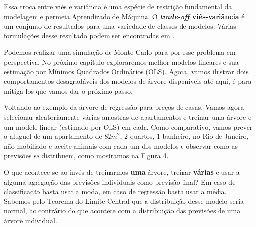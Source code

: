 Essa troca entre viés e variância é uma espécie de restrição fundamental da modelagem e permeia Aprendizado de Máquina. O \textbf{\textit{trade-off} viés-variância} é um conjunto de resultados para uma variedade de classes de modelos. Várias formulações desse resultado podem ser encontradas em .

Podemos realizar uma simulação de Monte Carlo para por esse problema em perspectiva. No próximo capítulo exploraremos melhor modelos lineares e sua estimação por Mínimos Quadrados Ordinários (OLS). Agora, vamos ilustrar dois comportamentos desagradáveis dos modelos de árvore disponíveis até aqui, é para mitiga-los que vamos dar o próximo passo. 

Voltando ao exemplo da árvore de regressão para preços de casas. Vamos agora selecionar aleatoriamente várias amostras de apartamentos e treinar uma árvore e um modelo linear (estimado por OLS) em cada. Como comparativo, vamos prever o aluguel de um apartamento de $82m^2$, $2$ quartos, $1$ banheiro, no Rio de Janeiro, não-mobiliado e aceite animais com cada um dos modelos e observar como as previsões se distribuem, como mostramos na Figura 4.

\begin{figure}[H]
    \centering
        \label{fig:arvore_var_ols}
\end{figure}


O que acontece se ao invés de treinarmos \textbf{uma} árvore, treinar \textbf{várias} e usar a alguma agregação das previsões individuais como previsão final? Em caso de classificação basta usar a moda, em caso de regressão basta usar a média. Sabemos pelo Teorema do Limite Central que a distribuição desse modelo seria normal, ao contrário do que acontece com a distribuição das previsões de uma árvore individual. 

